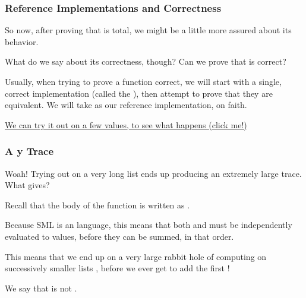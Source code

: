 \documentclass[aspectratio=169, handout]{beamer}
\begin{document}

\begin{frame}[fragile]
  \frametitle{Reference Implementations and Correctness}

  So now, after proving that  is total, we might be a little more assured about its
  behavior.

  \pause
  \vspace{\fill}

  What do we say about its correctness, though? Can we prove that  is correct?

  \pause
  \vspace{\fill}

  Usually, when trying to prove a function correct, we will start with a single, correct implementation
  (called the ), then attempt to prove that they are equivalent. We will
  take  as our reference implementation, on faith.

  \pause
  \vspace{\fill}

  {\color{blue}\href{https://asciinema.org/a/587202}{We can try it out on a few values, to see what happens (click me!)}}

\end{frame}

\begin{frame}[fragile]
  \frametitle{A y Trace}

  Woah! Trying out  on a very long list ends up producing an extremely large trace.
  What gives?

  \vspace{\fill}

  Recall that the body of the  function is written as .

  \pause
  \vspace{\fill}

  Because SML is an  language, this means that both  and 
  must be independently evaluated to values, before they can be summed, in that order.

  \pause
  \vspace{\fill}

  This means that we end up on a very large rabbit hole of computing  on successively
  smaller lists , before we ever get to add the first !

  \pause
  \vspace{\fill}

  We say that  is not .
\end{frame}
\end{document}
